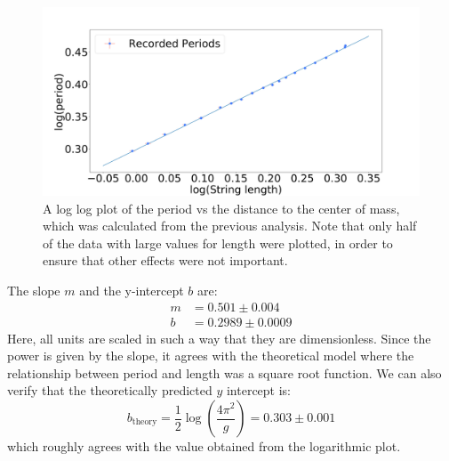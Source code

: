 \documentclass[%
 reprint,
 amsmath,amssymb
 aps,
]{revtex4-2}
\begin{document}
\begin{figure}[!h]
    \includegraphics[width=\linewidth]{Figures/log_2.png}

    \caption{A log log plot of the period vs the distance to the center of mass, which was calculated from the previous analysis. Note that only half of the data with large values for length were plotted, in order to ensure that other effects were not important.}
    \label{fig:log-2}
\end{figure}
The slope $m$ and the y-intercept $b$ are:
\begin{align}
    m &= 0.501 \pm 0.004 \\ 
    b &= 0.2989 \pm 0.0009
\end{align}
Here, all units are scaled in such a way that they are dimensionless. Since the power is given by the slope, it agrees with the theoretical model where the relationship between period and length was a square root function. We can also verify that the theoretically predicted $y$ intercept is:
\begin{equation}
    b_\text{theory} = \frac{1}{2}\log\left(\frac{4\pi^2}{g}\right) = 0.303 \pm 0.001
    \label{eq:}
\end{equation}
which roughly agrees with the value obtained from the logarithmic plot.
\end{document}
